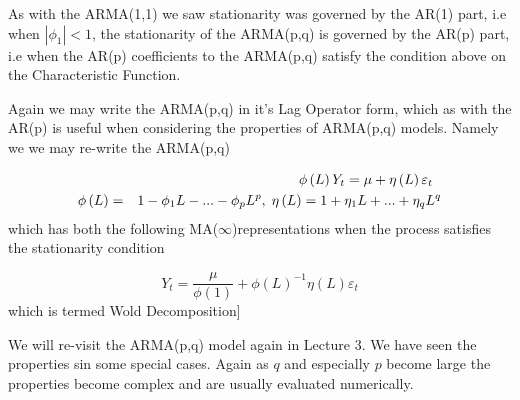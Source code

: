 \documentclass[openany]{tufte-book} %
\begin{document}
As with the ARMA(1,1) we saw stationarity was governed by the AR(1) part, i.e when $|\phi_1|<1$, the stationarity of the ARMA(p,q) is governed by the AR(p) part, i.e when the AR(p) coefficients to the ARMA(p,q) satisfy the condition above on the Characteristic Function.

Again we may write the ARMA(p,q) in it's Lag Operator form, which as with the AR(p) is useful when considering the properties of ARMA(p,q) models. Namely we we may re-write the ARMA(p,q)

\begin{eqnarray*}
&&\qquad
\begin{tabular}{l}
$\phi \left( L\right) Y_{t}=\mu +\eta \left( L\right) \varepsilon _{t}$%
\end{tabular}
\\
\phi \left( L\right) &=&1-\phi _{1}L-...-\phi _{p}L^{p},\;\eta \left(
L\right) =1+\eta _{1}L+...+\eta _{q}L^{q}
\end{eqnarray*}
which has both the following  MA($ \infty$)representations when the process satisfies the stationarity condition



\begin{equation*}
Y_{t}=\frac{\mu }{\phi (1)}+\phi (L)^{-1}\eta \left( L\right)
\varepsilon _{t}
\end{equation*}
which is termed  Wold Decomposition]\medskip



We will re-visit the ARMA(p,q) model again in Lecture 3. We have seen the properties sin some special cases. Again as $q$ and especially $p$ become large the properties become complex and are usually evaluated numerically.
\end{document}
